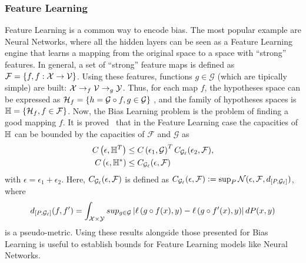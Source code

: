 \subsubsection*{Feature Learning}
Feature Learning is a common way to encode bias. The most popular example are Neural Networks, where all the hidden layers can be seen as a Feature Learning engine that learns a mapping from the original space to a space with ``strong'' features.
In general, a set of ``strong'' feature maps is defined as $\mathcal{F} = \left\{f, f: \mathcal{X} \to \mathcal{V}\right\}$. Using these features, functions $g \in \mathcal{G}$ (which are tipically simple) are built:
$\mathcal{X} \to_f \mathcal{V} \to_g \mathcal{Y}$.
Thus, for each map $f$, the hypotheses space can be expressed as 
$\mathcal{H}_f = \left\{h = \mathcal{G} \circ f, g \in \mathcal{G}\right\}$
, and the family of hypotheses spaces is 
$\mathbb{H} = \left\{\mathcal{H}_f, f \in \mathcal{F}\right\}$.
Now, the Bias Learning problem is the problem of finding a good mapping $f$.
It is proved~\cite[Theorem~6]{baxter2000model} that in the Feature Learning case the capacities of $\mathbb{H}$ can be bounded by the capacities of $\mathcal{F}$ and $\mathcal{G}$ as
\begin{align*}
    C\left(\epsilon, \mathbb{H}^{T}\right) &\leq C\left(\epsilon_1, \mathcal{G}\right)^T C_{\mathcal{G}_\ell}(\epsilon_2, \mathcal{F}) , \\
    C\left(\epsilon, \mathbb{H}^{*}\right) &\leq C_{\mathcal{G}_\ell}(\epsilon, \mathcal{F})
\end{align*}
with $\epsilon = \epsilon_1 + \epsilon_2 $. Here, $C_{\mathcal{G}_\ell}(\epsilon, \mathcal{F})$ is defined as 
$C_{\mathcal{G}_\ell}(\epsilon, \mathcal{F}) \vcentcolon= \sup_P \mathcal{N}(\epsilon, \mathcal{F}, d_{[P, \mathcal{G}_\ell]})$, where
$$ d_{[P, \mathcal{G}_\ell]}(f, f') = \int_{\mathcal{X} \times \mathcal{Y}} sup_{g \in \mathcal{G}} \left|\ell\left( g \circ f(x), y\right) - \ell\left( g \circ f'(x), y\right)\right| dP(x, y)$$
is a pseudo-metric. Using these results alongside those presented for Bias Learning is useful to establish bounds for Feature Learning models like Neural Networks.

